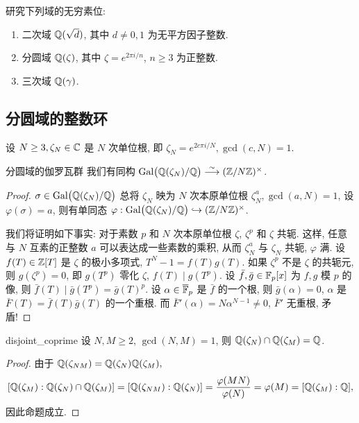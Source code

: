 \begin{exercise}
研究下列域的无穷素位: 
\begin{enumerate}
\item 二次域 ${\mathbb{Q}}(\sqrt{d})$, 其中 $d\neq 0,1$ 为无平方因子整数.
\item 分圆域 ${\mathbb{Q}}(\zeta)$, 其中 $\zeta=e^{2\pi i/n}$, $n\ge 3$ 为正整数.
\item 三次域 ${\mathbb{Q}}(\gamma)$.
\end{enumerate}
\end{exercise}


\subsection{分圆域的整数环}
设 $N\ge 3, \zeta_N\in{\mathbb{C}}$ 是 $N$ 次单位根, 即 $\zeta_N=e^{2c\pi i/N}, \gcd(c,N)=1$.

\begin{proposition}{分圆域的伽罗瓦群}{}
我们有同构 $\operatorname{{\mathrm{Gal}}}\bigl({\mathbb{Q}}(\zeta_N)/{\mathbb{Q}}\bigr)\stackrel{\sim}{\longrightarrow} ({\mathbb{Z}}/N{\mathbb{Z}})^\times$.
\end{proposition}
\begin{proof}
$\sigma\in \operatorname{{\mathrm{Gal}}}\bigl({\mathbb{Q}}(\zeta_N)/{\mathbb{Q}}\bigr)$ 总将 $\zeta_N$ 映为 $N$ 次本原单位根 $\zeta_N^a,\gcd(a,N)=1$, 设 $\varphi(\sigma)=a$, 则有单同态 $\varphi: \operatorname{{\mathrm{Gal}}}\bigl({\mathbb{Q}}(\zeta_N)/{\mathbb{Q}}\bigr)\hookrightarrow ({\mathbb{Z}}/N{\mathbb{Z}})^\times$.

我们将证明如下事实: 对于素数 $p$ 和 $N$ 次本原单位根 $\zeta$, $\zeta^p$ 和 $\zeta$ 共轭. 这样, 任意与 $N$ 互素的正整数 $a$ 可以表达成一些素数的乘积, 从而 $\zeta_N^a$ 与 $\zeta_N$ 共轭, $\varphi$ 满. 设 $f(T)\in{\mathbb{Z}}[T]$ 是 $\zeta$ 的极小多项式, $T^N-1=f(T)g(T)$. 如果 $\zeta^p$ 不是 $\zeta$ 的共轭元, 则 $g(\zeta^p)=0$, 即 $g(T^p)$ 零化 $\zeta$, $f(T)\mid g(T^p)$. 设 $\bar f,\bar g\in{\mathbb{F}}_p[x]$ 为 $f,g$ 模 $p$ 的像, 则 $\bar f(T)\mid \bar g(T^p)=\bar g(T)^p$. 设 $\alpha\in\overline{{\mathbb{F}}}_p$ 是 $\bar f$ 的一个根, 则 $\bar g(\alpha)=0$, $\alpha$ 是 $\bar F(T)=\bar f(T)\bar g(T)$ 的一个重根. 而 $\bar F'(\alpha)=N\alpha^{N-1}\neq 0$, $\bar F'$ 无重根, 矛盾! 
\end{proof}

\begin{corollary}{}{disjoint_coprime}
设 $N,M\ge 2$, $\gcd(N,M)=1$, 则 ${\mathbb{Q}}(\zeta_N)\cap {\mathbb{Q}}(\zeta_M)={\mathbb{Q}}$.
\end{corollary}
\begin{proof}
由于 ${\mathbb{Q}}(\zeta_{NM})={\mathbb{Q}}(\zeta_N){\mathbb{Q}}(\zeta_M),$
  \[[{\mathbb{Q}}(\zeta_M):{\mathbb{Q}}(\zeta_N)\cap {\mathbb{Q}}(\zeta_M)]
  =[{\mathbb{Q}}(\zeta_{NM}):{\mathbb{Q}}(\zeta_N)]
  =\frac{\varphi(MN)}{\varphi(N)}
  =\varphi(M)
  =[{\mathbb{Q}}(\zeta_M):{\mathbb{Q}}],\]
因此命题成立.
\end{proof}

